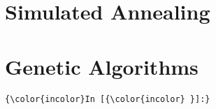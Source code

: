 \documentclass[12pt, landscape, twocolumn]{article}
\begin{document}
    \section{Simulated Annealing}\label{simulated-annealing}

    \section{Genetic Algorithms}\label{genetic-algorithms}

    \begin{Verbatim}[commandchars=\\\{\}]
{\color{incolor}In [{\color{incolor} }]:} 
\end{Verbatim}


    
    
    
    
\end{document}
